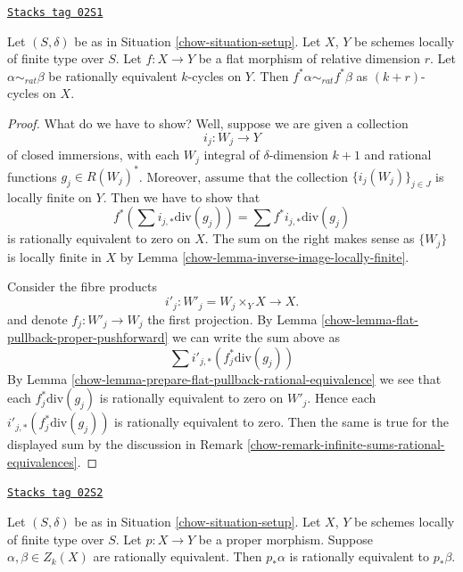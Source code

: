 \begin{lemma}
\label{chow-lemma-flat-pullback-rational-equivalence}
\href{https://stacks.math.columbia.edu/tag/02S1}{\texttt{Stacks tag 02S1}}

Let $(S, \delta)$ be as in Situation \ref{chow-situation-setup}.
Let $X$, $Y$ be schemes locally of finite type over $S$.
Let $f : X \to Y$ be a flat morphism of relative dimension $r$.
Let $\alpha \sim_{rat} \beta$ be rationally equivalent $k$-cycles on $Y$.
Then $f^*\alpha \sim_{rat} f^*\beta$ as $(k + r)$-cycles on $X$.
\end{lemma}

\begin{proof}

What do we have to show? Well, suppose we are given a collection
$$
i_j : W_j \longrightarrow Y
$$
of closed immersions, with each $W_j$ integral of $\delta$-dimension $k + 1$
and rational functions $g_j \in R(W_j)^*$. Moreover, assume that
the collection $\{i_j(W_j)\}_{j \in J}$ is locally finite on $Y$.
Then we have to show that
$$
f^*(\sum i_{j, *}\text{div}(g_j)) = \sum f^*i_{j, *}\text{div}(g_j)
$$
is rationally equivalent to zero on $X$. The sum on the right
makes sense as $\{W_j\}$ is locally finite in $X$ by
Lemma \ref{chow-lemma-inverse-image-locally-finite}.

\medskip\noindent
Consider the fibre products
$$
i'_j : W'_j = W_j \times_Y X \longrightarrow X.
$$
and denote $f_j : W'_j \to W_j$ the first projection.
By Lemma \ref{chow-lemma-flat-pullback-proper-pushforward}
we can write the sum above as
$$
\sum i'_{j, *}(f_j^*\text{div}(g_j))
$$
By Lemma \ref{chow-lemma-prepare-flat-pullback-rational-equivalence}
we see that each $f_j^*\text{div}(g_j)$ is rationally equivalent
to zero on $W'_j$. Hence each $i'_{j, *}(f_j^*\text{div}(g_j))$
is rationally equivalent to zero. Then the same is true for
the displayed sum by the discussion in
Remark \ref{chow-remark-infinite-sums-rational-equivalences}.
\end{proof}

\begin{lemma}
\label{chow-lemma-proper-pushforward-rational-equivalence}
\href{https://stacks.math.columbia.edu/tag/02S2}{\texttt{Stacks tag 02S2}}

Let $(S, \delta)$ be as in Situation \ref{chow-situation-setup}.
Let $X$, $Y$ be schemes locally of finite type over $S$.
Let $p : X \to Y$ be a proper morphism.
Suppose $\alpha, \beta \in Z_k(X)$ are rationally equivalent.
Then $p_*\alpha$ is rationally equivalent to $p_*\beta$.
\end{lemma}

